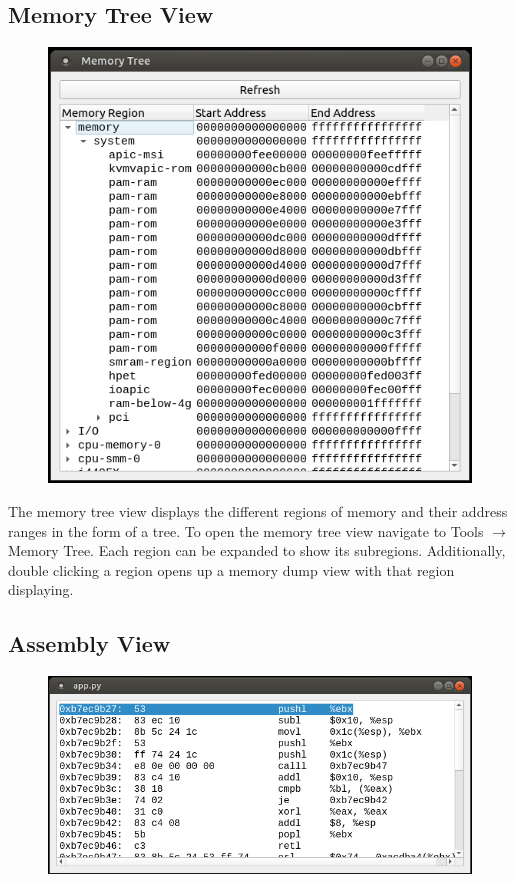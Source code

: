 \documentclass{article}
\begin{document}
\subsection{Memory Tree View}
\begin{figure}[h]
    \centering
    \includegraphics[width=.6\textwidth]{images/MemTree.PNG}
    \label{fig:memtree}
\end{figure}
The memory tree view displays the different regions of memory and their address ranges in the form of a tree. To open the memory tree view navigate to Tools $\rightarrow$ Memory Tree. Each region can be expanded to show its subregions. Additionally, double clicking a region opens up a memory dump view with that region displaying.
\newpage
\subsection{Assembly View}
\begin{figure}[h]
    \centering
    \includegraphics[width=.6\textwidth]{images/AssemblyView.PNG}
    \label{fig:asmview}
\end{figure}
\end{document}
